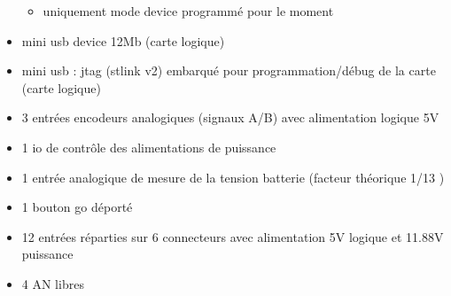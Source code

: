 \begin{itemize}
\begin{itemize}
			\item uniquement mode device programmé pour le moment
		\end{itemize}
	\item mini usb device 12Mb (carte logique)
	\item mini usb : jtag (stlink v2) embarqué pour programmation/débug de la carte (carte logique)
	\item 3 entrées encodeurs analogiques (signaux A/B) avec alimentation logique 5V
	\item 1 io de contrôle des alimentations de puissance
	\item 1 entrée analogique de mesure de la tension batterie (facteur théorique 1/13 )
	\item 1 bouton go déporté
	\item 12 entrées réparties sur 6 connecteurs avec alimentation 5V logique et 11.88V puissance
	\item 4 AN libres
\end{itemize}

\clearpage
